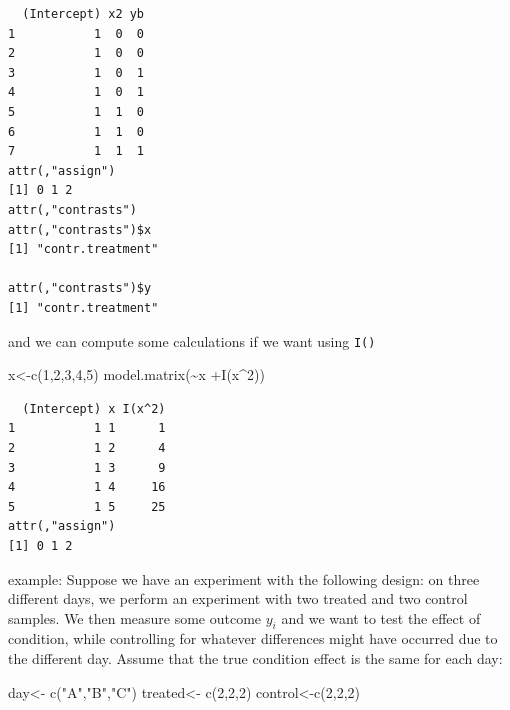 \documentclass[
  letterpaper,
  DIV=11,
  numbers=noendperiod]{scrartcl}
\newenvironment{Shaded}{\begin{snugshade}}{\end{snugshade}}
\newcommand{\DecValTok}[1]{\textcolor[rgb]{0.68,0.00,0.00}{#1}}
\newcommand{\FunctionTok}[1]{\textcolor[rgb]{0.28,0.35,0.67}{#1}}
\newcommand{\NormalTok}[1]{\textcolor[rgb]{0.00,0.23,0.31}{#1}}
\newcommand{\OtherTok}[1]{\textcolor[rgb]{0.00,0.23,0.31}{#1}}
\newcommand{\SpecialCharTok}[1]{\textcolor[rgb]{0.37,0.37,0.37}{#1}}
\newcommand{\StringTok}[1]{\textcolor[rgb]{0.13,0.47,0.30}{#1}}
\begin{document}
\begin{verbatim}
  (Intercept) x2 yb
1           1  0  0
2           1  0  0
3           1  0  1
4           1  0  1
5           1  1  0
6           1  1  0
7           1  1  1
attr(,"assign")
[1] 0 1 2
attr(,"contrasts")
attr(,"contrasts")$x
[1] "contr.treatment"

attr(,"contrasts")$y
[1] "contr.treatment"
\end{verbatim}

and we can compute some calculations if we want using \texttt{I()}

\begin{Shaded}
\begin{Highlighting}[]
\NormalTok{x}\OtherTok{\textless{}{-}}\FunctionTok{c}\NormalTok{(}\DecValTok{1}\NormalTok{,}\DecValTok{2}\NormalTok{,}\DecValTok{3}\NormalTok{,}\DecValTok{4}\NormalTok{,}\DecValTok{5}\NormalTok{)}
\FunctionTok{model.matrix}\NormalTok{(}\SpecialCharTok{\textasciitilde{}}\NormalTok{x }\SpecialCharTok{+}\FunctionTok{I}\NormalTok{(x}\SpecialCharTok{\^{}}\DecValTok{2}\NormalTok{))}
\end{Highlighting}
\end{Shaded}

\begin{verbatim}
  (Intercept) x I(x^2)
1           1 1      1
2           1 2      4
3           1 3      9
4           1 4     16
5           1 5     25
attr(,"assign")
[1] 0 1 2
\end{verbatim}

example: Suppose we have an experiment with the following design: on
three different days, we perform an experiment with two treated and two
control samples. We then measure some outcome \(y_i\) and we want to
test the effect of condition, while controlling for whatever differences
might have occurred due to the different day. Assume that the true
condition effect is the same for each day:

\begin{Shaded}
\begin{Highlighting}[]
\NormalTok{day}\OtherTok{\textless{}{-}} \FunctionTok{c}\NormalTok{(}\StringTok{"A"}\NormalTok{,}\StringTok{"B"}\NormalTok{,}\StringTok{"C"}\NormalTok{)}
\NormalTok{treated}\OtherTok{\textless{}{-}} \FunctionTok{c}\NormalTok{(}\DecValTok{2}\NormalTok{,}\DecValTok{2}\NormalTok{,}\DecValTok{2}\NormalTok{)}
\NormalTok{control}\OtherTok{\textless{}{-}}\FunctionTok{c}\NormalTok{(}\DecValTok{2}\NormalTok{,}\DecValTok{2}\NormalTok{,}\DecValTok{2}\NormalTok{)}
\end{Highlighting}
\end{Shaded}
\end{document}
